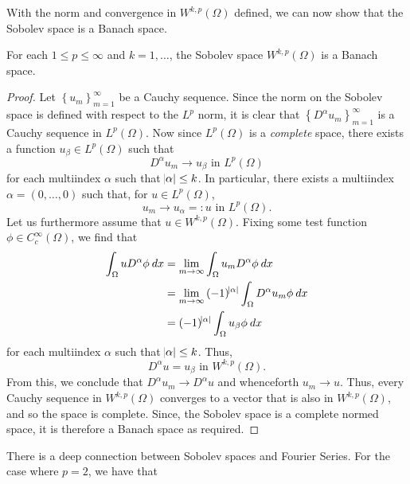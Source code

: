\documentclass[10pt]{article}
\begin{document}
With the norm and convergence in $W^{k,p}(\Omega)$ defined, we can now show that the Sobolev space is a Banach space.
\begin{theorem}
	For each $1 \leq p \leq \infty$ and $k = 1, \dots$, the Sobolev space $W^{k,p}(\Omega)$ is a Banach space. 
\end{theorem} 
\begin{proof}
	Let $\left\{ u_m \right\}_{m=1}^{\infty}$ be a Cauchy sequence. Since the norm on the Sobolev space is defined with respect to the $L^p$ norm, it is clear that $\left\{ D^\alpha u_m \right\}_{m=1}^{\infty}$ is a Cauchy sequence in $L^p(\Omega)$. Now since $L^p(\Omega)$ is a \textit{complete} space, there exists a function $u_{\beta} \in L^p(\Omega)$ such that 
	\begin{equation*}
		\displaystyle D^\alpha u_m \to u_\beta \textrm{ in } L^p(\Omega)
	\end{equation*}
	for each multiindex $\alpha$ such that $\abs{\alpha} \leq k$. In particular, there exists a multiindex $\alpha = (0,\dots,0)$ such that, for $u \in L^p(\Omega)$, 
	\begin{equation*}
		\displaystyle u_m \to u_{\alpha} =: u \textrm{ in } L^p(\Omega). 
	\end{equation*}
	Let us furthermore assume that $u \in W^{k,p}(\Omega)$. Fixing some test function $\phi \in C^{\infty}_c(\Omega)$, we find that
	\begin{align*}
		\displaystyle \int_{\Omega}{uD^{\alpha}\phi \: dx} &= \lim\limits_{m \to \infty}{\int_{\Omega}{u_m D^\alpha \phi \: dx}} \\
		&= \lim\limits_{m \to \infty}{(-1)^{\abs{\alpha}} \int_{\Omega}{D^\alpha u_m \phi \: dx}} \\
		&= (-1)^{\abs{\alpha}} \int_{\Omega}{u_\beta \phi \: dx}
	\end{align*}
	for each multiindex $\alpha$ such that $\abs{\alpha} \leq k$. Thus,  
	\begin{equation*}
		\displaystyle D^\alpha u = u_\beta \textrm{ in } W^{k,p}(\Omega).
	\end{equation*}
	From this, we conclude that $D^\alpha u_m \to D^\alpha u$ and whenceforth $u_m \to u$. Thus, every Cauchy sequence in $W^{k,p}(\Omega)$ converges to a vector that is also in $W^{k,p}(\Omega)$, and so the space is complete. Since, the Sobolev space is a complete normed space, it is therefore a Banach space as required. 
\end{proof}
There is a deep connection between Sobolev spaces and Fourier Series. For the case where $p = 2$, we have that 
\end{document}
